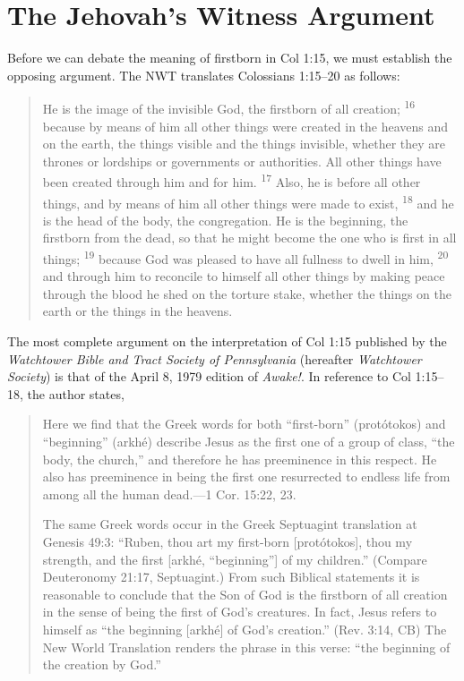 \section{The Jehovah's Witness Argument}

Before we can debate the meaning of firstborn in Col 1:15, we must establish the opposing argument. The NWT translates Colossians 1:15--20 as follows:

\begin{quote}
	He is the image of the invisible God, the firstborn of all creation; \textsuperscript{16} because by means of him all other things were created in the heavens and on the earth, the things visible and the things invisible, whether they are thrones or lordships or governments or authorities. All other things have been created through him and for him. \textsuperscript{17} Also, he is before all other things, and by means of him all other things were made to exist, \textsuperscript{18} and he is the head of the body, the congregation. He is the beginning, the firstborn from the dead, so that he might become the one who is first in all things; \textsuperscript{19} because God was pleased to have all fullness to dwell in him, \textsuperscript{20}  and through him to reconcile to himself all other things by making peace through the blood he shed on the torture stake, whether the things on the earth or the things in the heavens.
\end{quote}

The most complete argument on the interpretation of Col 1:15 published by the \emph{Watchtower Bible and Tract Society of Pennsylvania} (hereafter \emph{Watchtower Society}) is that of the April 8, 1979 edition of \emph{Awake!}.\autocite{awake1979firstborn} In reference to Col 1:15--18, the author states,

\begin{quote}
	Here we find that the Greek words for both ``first-born'' (protótokos) and ``beginning'' (arkhé) describe Jesus as the first one of a group of class, ``the body, the church,'' and therefore he has preeminence in this respect. He also has preeminence in being the first one resurrected to endless life from among all the human dead.---1 Cor. 15:22, 23.

	The same Greek words occur in the Greek Septuagint translation at Genesis 49:3: “Ruben, thou art my first-born [protótokos], thou my strength, and the first [arkhé, “beginning”] of my children.” (Compare Deuteronomy 21:17, Septuagint.) From such Biblical statements it is reasonable to conclude that the Son of God is the firstborn of all creation in the sense of being the first of God’s creatures. In fact, Jesus refers to himself as “the beginning [arkhé] of God’s creation.” (Rev. 3:14, CB) The New World Translation renders the phrase in this verse: “the beginning of the creation by God.”
\end{quote}

